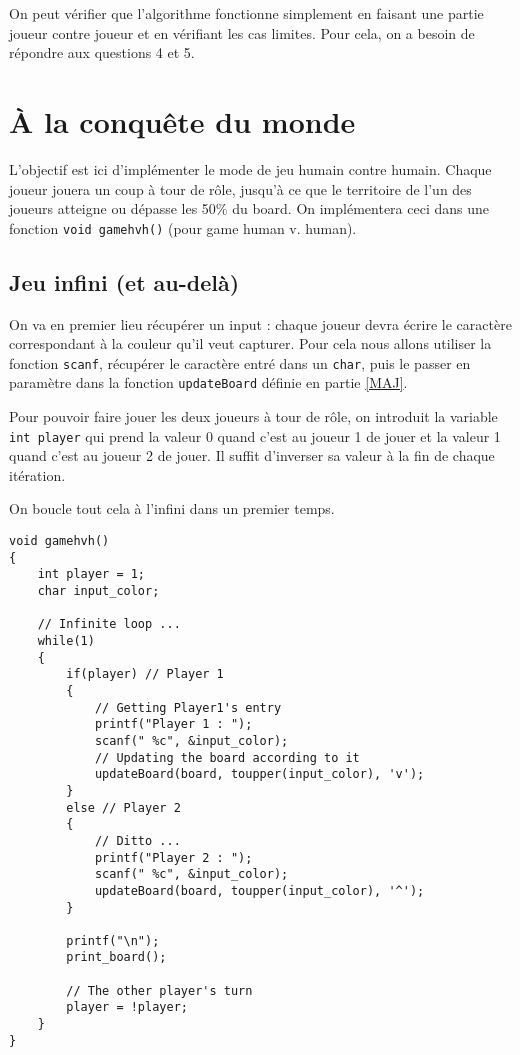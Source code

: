 \documentclass[a4paper,11pt]{article}
\begin{document}
	On peut vérifier que l'algorithme fonctionne simplement en faisant une partie joueur contre joueur et en vérifiant les cas limites. Pour cela, on a besoin de répondre aux questions 4 et 5.
	
	
	
	\section{À la conquête du monde}
	
	L'objectif est ici d'implémenter le mode de jeu humain contre humain. Chaque joueur jouera un coup à tour de rôle, jusqu'à ce que le territoire de l'un des joueurs atteigne ou dépasse les 50\% du board. On implémentera ceci dans une fonction \texttt{void gamehvh()} (pour game human v. human).
	
	
	\subsection{Jeu infini (et au-delà)}
	
	On va en premier lieu récupérer un input : chaque joueur devra écrire le caractère correspondant à la couleur qu'il veut capturer. Pour cela nous allons utiliser la fonction \texttt{scanf}, récupérer le caractère entré dans un \texttt{char}, puis le passer en paramètre dans la fonction \texttt{updateBoard} définie en partie \ref{MAJ}.
	
	Pour pouvoir faire jouer les deux joueurs à tour de rôle, on introduit la variable \texttt{int player} qui prend la valeur 0 quand c'est au joueur 1 de jouer et la valeur 1 quand c'est au joueur 2 de jouer. Il suffit d'inverser sa valeur à la fin de chaque itération.
	
	On boucle tout cela à l'infini dans un premier temps.
	
	\begin{lstlisting}
void gamehvh()
{
	int player = 1;
	char input_color;
	
	// Infinite loop ...
	while(1)
	{
		if(player) // Player 1
		{
			// Getting Player1's entry
			printf("Player 1 : ");
			scanf(" %c", &input_color);
			// Updating the board according to it
			updateBoard(board, toupper(input_color), 'v');
		}
		else // Player 2
		{
			// Ditto ...
			printf("Player 2 : ");
			scanf(" %c", &input_color);
			updateBoard(board, toupper(input_color), '^');
		}
		
		printf("\n");
		print_board();
		
		// The other player's turn
		player = !player;
	}
}
	\end{lstlisting}
	
\end{document}
